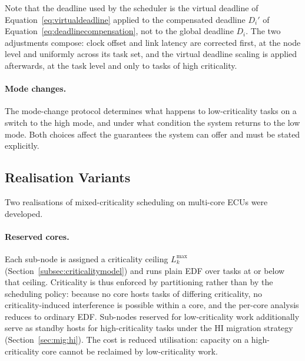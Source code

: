 Note that the deadline used by the scheduler is the virtual deadline of
Equation~\ref{eq:virtualdeadline} applied to the compensated deadline $D_i'$
of Equation~\ref{eq:deadlinecompensation}, not to the global deadline $D_i$.
The two adjustments compose: clock offset and link latency are corrected
first, at the node level and uniformly across its task set, and the virtual
deadline scaling is applied afterwards, at the task level and only to tasks of
high criticality.

\paragraph{Mode changes.} %
The mode-change protocol determines what happens to low-criticality tasks on a
switch to the high mode, and under what condition the system returns to the low
mode. Both choices affect the guarantees the system can offer and must be
stated explicitly.

\subsection{Realisation Variants}\label{subsec:os:schedvariants}

Two realisations of mixed-criticality scheduling on multi-core ECUs were
developed.

\paragraph{Reserved cores.} Each sub-node is assigned a criticality ceiling
$L_k^{\max}$ (Section~\ref{subsec:criticalitymodel}) and runs plain EDF over
tasks at or below that ceiling. Criticality is thus enforced by partitioning
rather than by the scheduling policy: because no core hosts tasks of differing
criticality, no criticality-induced interference is possible within a core,
and the per-core analysis reduces to ordinary EDF. Sub-nodes reserved for
low-criticality work additionally serve as standby hosts for high-criticality
tasks under the \textsf{HI} migration strategy
(Section~\ref{sec:mig:hi}). The cost is reduced utilisation: capacity on a
high-criticality core cannot be reclaimed by low-criticality work.

